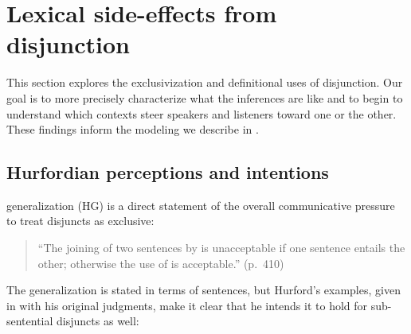 \documentclass[12pt,twoside]{article}
\renewcommand{\_}{\textbf{\textunderscore\hspace{-4pt}\textunderscore\hspace{-3pt}\textunderscore\hspace{-4pt}\textunderscore}\hspace{0.5pt}}			%
\begin{document}

\section{Lexical side-effects from disjunction}\label{sec:data}

This section explores the exclusivization and definitional uses of
disjunction. Our goal is to more precisely characterize what the
inferences are like and to begin to understand which contexts steer
speakers and listeners toward one or the other. These findings inform
the modeling we describe in .


\subsection{Hurfordian perceptions and intentions}\label{sec:data:overlapping}

 generalization (HG) is a direct statement of
the overall communicative pressure to treat disjuncts as exclusive:
%
\begin{quote}
  ``The joining of two sentences by  is unacceptable if one
  sentence entails the other; otherwise the use of  is
  acceptable.'' (p.~410)
\end{quote}
%
The generalization is stated in terms of sentences, but Hurford's
examples, given in  with his original judgments, make it clear
that he intends it to hold for sub-sentential disjuncts as well:
%
\begin{exe}
\ex\label{hex}
  \begin{xlist}
  \end{xlist}
\end{exe}
\end{document}
